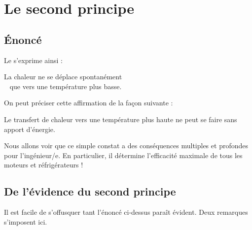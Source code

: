 
\section{Le second principe}

	\subsection{Énoncé}

		Le  s’exprime ainsi :

		\begin{principe}
		La chaleur ne se déplace spontanément\hspace{1ex} \\		
		\hspace{1ex} \  que vers une température plus basse.
		\end{principe}

		On peut préciser cette affirmation de la façon suivante :

		\begin{trucimportant}
		Le transfert de chaleur vers une température plus haute\linebreak
		ne peut se faire sans apport d’énergie.
		\end{trucimportant}

		Nous allons voir que ce simple constat a des conséquences multiples et profondes pour l’ingénieur/e. En particulier, il détermine l’efficacité maximale de tous les moteurs et réfrigérateurs !



	\subsection{De l’évidence du second principe}

		Il est facile de s’offusquer tant l’énoncé ci-dessus paraît évident. Deux remarques s’imposent ici.

